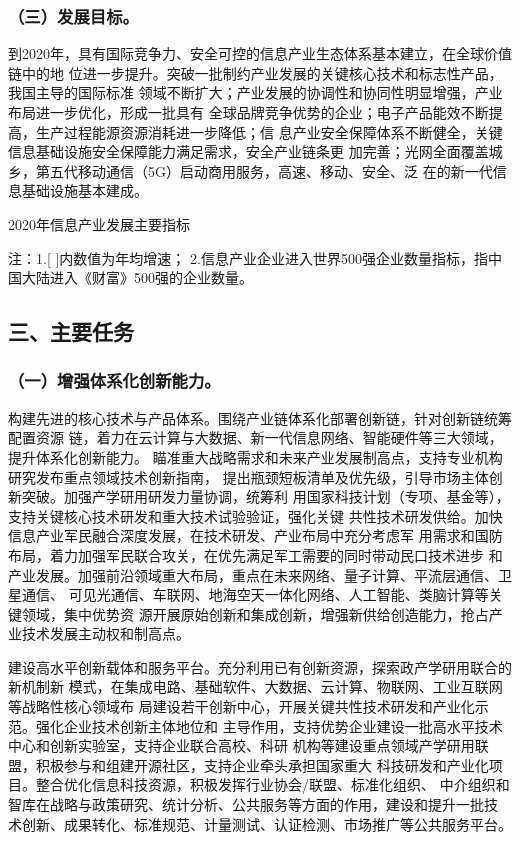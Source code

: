 \documentclass[11pt]{ctexart}
\begin{document}
{{{{\subsubsection{（三）发展目标。}
\label{sec:orgf247367}

到2020年，具有国际竞争力、安全可控的信息产业生态体系基本建立，在全球价值链中的地
位进一步提升。突破一批制约产业发展的关键核心技术和标志性产品，我国主导的国际标准
领域不断扩大；产业发展的协调性和协同性明显增强，产业布局进一步优化，形成一批具有
全球品牌竞争优势的企业；电子产品能效不断提高，生产过程能源资源消耗进一步降低；信
息产业安全保障体系不断健全，关键信息基础设施安全保障能力满足需求，安全产业链条更
加完善；光网全面覆盖城乡，第五代移动通信（5G）启动商用服务，高速、移动、安全、泛
在的新一代信息基础设施基本建成。


2020年信息产业发展主要指标

注：1.[ ]内数值为年均增速；
2.信息产业企业进入世界500强企业数量指标，指中国大陆进入《财富》500强的企业数量。

\subsection{三、主要任务}
\label{sec:org55a7f97}


\subsubsection{（一）增强体系化创新能力。}
\label{sec:org89191ae}

构建先进的核心技术与产品体系。围绕产业链体系化部署创新链，针对创新链统筹配置资源
链，着力在云计算与大数据、新一代信息网络、智能硬件等三大领域，提升体系化创新能力。
瞄准重大战略需求和未来产业发展制高点，支持专业机构研究发布重点领域技术创新指南，
提出瓶颈短板清单及优先级，引导市场主体创新突破。加强产学研用研发力量协调，统筹利
用国家科技计划（专项、基金等），支持关键核心技术研发和重大技术试验验证，强化关键
共性技术研发供给。加快信息产业军民融合深度发展，在技术研发、产业布局中充分考虑军
用需求和国防布局，着力加强军民联合攻关，在优先满足军工需要的同时带动民口技术进步
和产业发展。加强前沿领域重大布局，重点在未来网络、量子计算、平流层通信、卫星通信、
可见光通信、车联网、地海空天一体化网络、人工智能、类脑计算等关键领域，集中优势资
源开展原始创新和集成创新，增强新供给创造能力，抢占产业技术发展主动权和制高点。

建设高水平创新载体和服务平台。充分利用已有创新资源，探索政产学研用联合的新机制新
模式，在集成电路、基础软件、大数据、云计算、物联网、工业互联网等战略性核心领域布
局建设若干创新中心，开展关键共性技术研发和产业化示范。强化企业技术创新主体地位和
主导作用，支持优势企业建设一批高水平技术中心和创新实验室，支持企业联合高校、科研
机构等建设重点领域产学研用联盟，积极参与和组建开源社区，支持企业牵头承担国家重大
科技研发和产业化项目。整合优化信息科技资源，积极发挥行业协会/联盟、标准化组织、
中介组织和智库在战略与政策研究、统计分析、公共服务等方面的作用，建设和提升一批技
术创新、成果转化、标准规范、计量测试、认证检测、市场推广等公共服务平台。

}}}}
\end{document}
